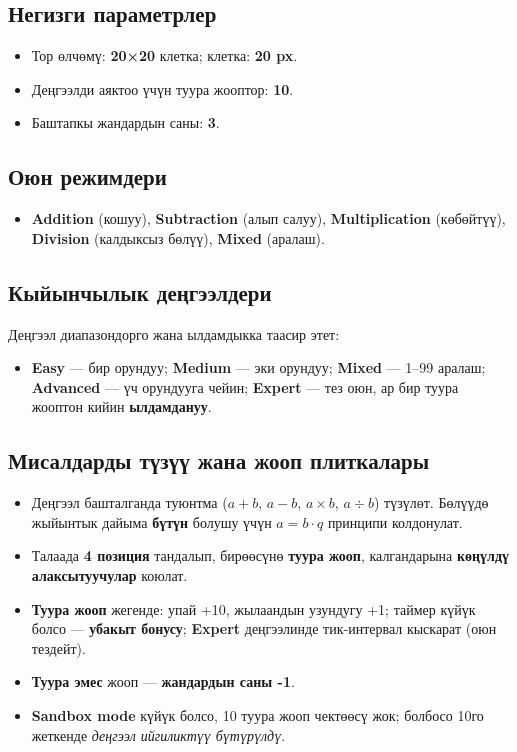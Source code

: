 \documentclass{article}
\begin{document}
\subsection{Негизги параметрлер}
\begin{itemize}
  \item Тор өлчөмү: \textbf{20×20} клетка; клетка: \textbf{20 px}.
  \item Деңгээлди аяктоо үчүн туура жооптор: \textbf{10}.
  \item Баштапкы жандардын саны: \textbf{3}.
\end{itemize}

\subsection{Оюн режимдери}
\begin{itemize}
  \item \textbf{Addition} (кошуу), \textbf{Subtraction} (алып салуу), \textbf{Multiplication} (көбөйтүү), \textbf{Division} (калдыксыз бөлүү), \textbf{Mixed} (аралаш).
\end{itemize}

\subsection{Кыйынчылык деңгээлдери}
Деңгээл диапазондорго жана ылдамдыкка таасир этет:
\begin{itemize}
  \item \textbf{Easy} — бир орундуу; \textbf{Medium} — эки орундуу; \textbf{Mixed} — 1–99 аралаш; \textbf{Advanced} — үч орундууга чейин; \textbf{Expert} — тез оюн, ар бир туура жооптон кийин \textbf{ылдамдануу}.
\end{itemize}

\subsection{Мисалдарды түзүү жана жооп плиткалары}
\begin{itemize}
  \item Деңгээл башталганда туюнтма (\(a{+}b\), \(a{-}b\), \(a{\times}b\), \(a{\div}b\)) түзүлөт. Бөлүүдө жыйынтык дайыма \textbf{бүтүн} болушу үчүн \(a = b \cdot q\) принципи колдонулат.
  \item Талаада \textbf{4 позиция} тандалып, бирөөсүнө \textbf{туура жооп}, калгандарына \textbf{көңүлдү алаксытуучулар} коюлат.
  \item \textbf{Туура жооп} жегенде: упай +10, жылаандын узундугу +1; таймер күйүк болсо — \textbf{убакыт бонусу}; \textbf{Expert} деңгээлинде тик-интервал кыскарат (оюн тездейт).
  \item \textbf{Туура эмес} жооп — \textbf{жандардын саны -1}.
  \item \textbf{Sandbox mode} күйүк болсо, 10 туура жооп чектөөсү жок; болбосо 10го жеткенде \textit{деңгээл ийгиликтүү бүтүрүлдү}.
\end{itemize}
\end{document}
